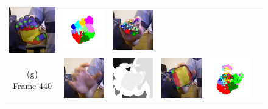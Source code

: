 \begin{figure}
\begin{tabular}{@{}cc@{}c@{}c@{}c@{}c@{}}
		\includegraphics[width=2.35cm]{fig/hand/qual/forth/image_0198.png} &
		\includegraphics[width=2.35cm]{fig/hand/qual/class/class-198.png} &
		\includegraphics[width=2.35cm]{fig/hand/qual/vote/image_0198.png} 
		\label{fig/hand/multi6} \\
		\raisebox{1cm}{\parbox{2cm}{\centering (g)\\Frame 440}} & 
		\includegraphics[width=2.35cm]{fig/hand/qual/rgb/image_0440.png} &
		\includegraphics[width=2.35cm]{fig/hand/qual/depth/image_0440.png} &
		\includegraphics[width=2.35cm]{fig/hand/qual/forth/image_0440.png} &
		\includegraphics[width=2.35cm]{fig/hand/qual/class/class-440.png} &

\end{tabular}
\end{figure}
